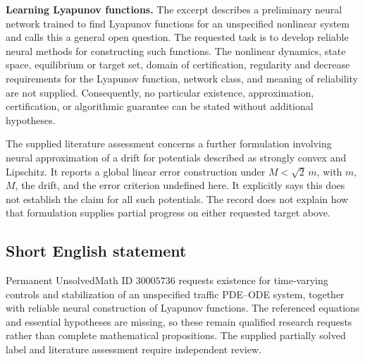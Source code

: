 \documentclass[11pt]{article}
\begin{document}
\textbf{Learning Lyapunov functions.} The excerpt describes a preliminary neural network trained to find Lyapunov functions for an unspecified nonlinear system and calls this a general open question. The requested task is to develop reliable neural methods for constructing such functions. The nonlinear dynamics, state space, equilibrium or target set, domain of certification, regularity and decrease requirements for the Lyapunov function, network class, and meaning of reliability are not supplied. Consequently, no particular existence, approximation, certification, or algorithmic guarantee can be stated without additional hypotheses.

The supplied literature assessment concerns a further formulation involving neural approximation of a drift for potentials described as strongly convex and Lipschitz. It reports a global linear error construction under \(M<\sqrt{2}\,m\), with \(m\), \(M\), the drift, and the error criterion undefined here. It explicitly says this does not establish the claim for all such potentials. The record does not explain how that formulation supplies partial progress on either requested target above.
\subsection{Short English statement}
Permanent UnsolvedMath ID \(30005736\) requests existence for time-varying controls and stabilization of an unspecified traffic PDE--ODE system, together with reliable neural construction of Lyapunov functions. The referenced equations and essential hypotheses are missing, so these remain qualified research requests rather than complete mathematical propositions. The supplied partially solved label and literature assessment require independent review.
\end{document}

